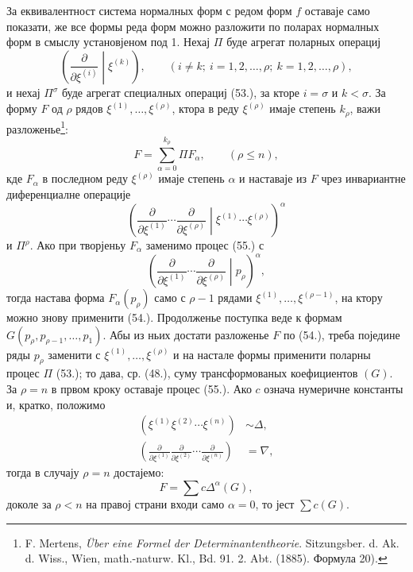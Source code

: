 ﻿\documentclass[11pt]{article}
\begin{document}
За еквивалентност система нормалных форм с редом форм $f$ оставаје само показати, же все формы реда форм можно разложити по поларах нормалных форм в смыслу установјеном под 1. Нехај $\Pi$ буде агрегат поларных операциј
\begin{equation}
 \left(\frac{\partial}{\partial\xi^{(i)}}\middle|\xi^{(k)}\right),
 \qquad (i\ne k;\ i=1,2,\ldots,\rho;\ k=1,2,\ldots,\rho),
\tag{53}
\end{equation}
и нехај $\Pi^\sigma$ буде агрегат специалных операциј (53.), за кторе $i=\sigma$ и $k<\sigma$. За форму $F$ од $\rho$ рядов $\xi^{(1)},\ldots,\xi^{(\rho)}$, ктора в реду $\xi^{(\rho)}$ имаје степень $k_\rho$, важи разложенье\footnote{F. Mertens, \emph{\"Uber eine Formel der Determinantentheorie}. Sitzungsber. d. Ak. d. Wiss., Wien, math.-naturw. Kl., Bd. 91. 2. Abt. (1885). Формула 20).}:
\begin{equation}
 F=\sum_{\alpha=0}^{k_\rho}\Pi F_\alpha,
 \qquad(\rho\le n),
\tag{54}
\end{equation}
кде $F_\alpha$ в последном реду $\xi^{(\rho)}$ имаје степень $\alpha$ и наставаје из $F$ чрез инвариантне диференциалне операције
\begin{equation}
 \left(\frac{\partial}{\partial\xi^{(1)}}\cdots\frac{\partial}{\partial\xi^{(\rho)}}\middle|\xi^{(1)}\cdots\xi^{(\rho)}\right)^\alpha
\tag{55}
\end{equation}
и $\Pi^\rho$. Ако при творјеньу $F_\alpha$ заменимо процес (55.) с
\begin{equation}
 \left(\frac{\partial}{\partial\xi^{(1)}}\cdots\frac{\partial}{\partial\xi^{(\rho)}}\middle|p_\rho\right)^\alpha,
\tag{56}
\end{equation}
тогда настава форма $F_\alpha(p_\rho)$ само с $\rho-1$ рядами $\xi^{(1)},\ldots,\xi^{(\rho-1)}$, на ктору можно знову применити (54.). Продолженье поступка веде к формам $G(p_\rho,p_{\rho-1},\ldots,p_1)$. Абы из ньих достати разложенье $F$ по (54.), треба поједине ряды $p_\rho$ заменити с $\xi^{(1)},\ldots,\xi^{(\rho)}$ и на настале формы применити поларны процес $\Pi$ (53.); то дава, ср. (48.), суму трансформованых коефициентов $(G)$. За $\rho=n$ в првом кроку оставаје процес (55.). Ако $c$ означа нумеричне константы и, кратко, положимо
\begin{equation}
\begin{aligned}
(\xi^{(1)}\xi^{(2)}\cdots\xi^{(n)})&\sim\Delta,\\
\left(\frac{\partial}{\partial\xi^{(1)}}\frac{\partial}{\partial\xi^{(2)}}\cdots\frac{\partial}{\partial\xi^{(n)}}\right)&=\nabla,
\end{aligned}
\tag{57}
\end{equation}
тогда в случају $\rho=n$ достајемо:
\begin{equation}
 F=\sum c\Delta^\alpha(G),
\tag{58}
\end{equation}
доколе за $\rho<n$ на правој страни входи само $\alpha=0$, то јест $\sum c(G)$.
\end{document}

